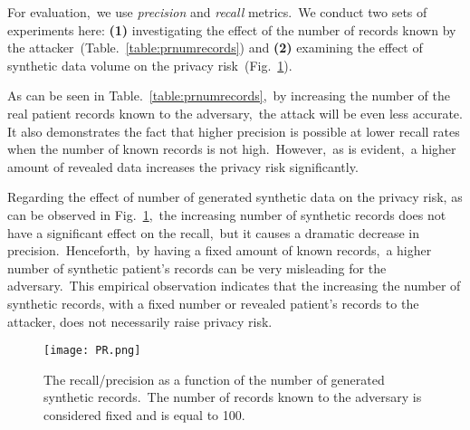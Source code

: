\documentclass[letterpaper]{article} \usepackage{aaai20}  \usepackage{times}  \usepackage{helvet} \usepackage{courier}  \usepackage[hyphens]{url}  \usepackage{graphicx} \urlstyle{rm} \def\UrlFont{\rm}  \usepackage{graphicx}  \frenchspacing  \setlength{\pdfpagewidth}{8.5in}  \setlength{\pdfpageheight}{11in}
\begin{document}
For evaluation,~we use \textit{precision} and \textit{recall} metrics.~We conduct two sets of experiments here: \textbf{(1)} investigating the effect of the number of records known by the attacker~(Table.~\ref{table:prnumrecords}) and \textbf{(2)} examining the effect of synthetic data volume on the privacy risk~(Fig.~\ref{fig:prsyntheticnumber}).





As can be seen in Table.~\ref{table:prnumrecords},~by increasing the number of the real patient records known to the adversary,~the attack will be even less accurate. It also demonstrates the fact that higher precision is possible at lower recall rates when the number of known records is not high.~However,~as is evident,~a higher amount of revealed data increases the privacy risk significantly. 

Regarding the effect of number of generated synthetic data on the privacy risk, as can be observed in Fig.~\ref{fig:prsyntheticnumber},~the increasing number of synthetic records does not have a significant effect on the recall,~but it causes a dramatic decrease in precision.~Henceforth,~by having a fixed amount of known records,~a higher number of synthetic patient's records can be very misleading for the adversary.~This empirical observation indicates that the increasing the number of synthetic records, with a fixed number or revealed patient's records to the attacker, does not necessarily raise privacy risk.


\begin{table}[t]
\caption{The precision and recall demonstrated as a function of the number of patients whose data is revealed to the attacker.  = \# of Known Records to the attacker.}\smallskip
\centering
{}
\label{table:prnumrecords}
\end{table}


\begin{figure}
\centering
    \texttt{[image: PR.png]}
    \caption[]{The recall/precision as a function of the number of generated
synthetic records.~The number of records known to the adversary is considered fixed and is equal to 100.} \label{fig:prsyntheticnumber}
\end{figure}
\end{document}
